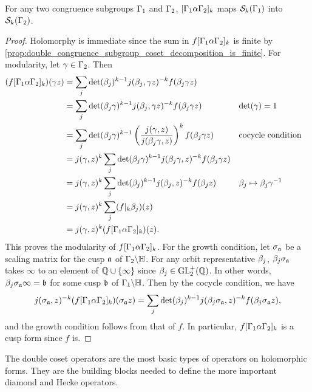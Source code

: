     \begin{proposition}\label{prop:double_coset_operator_preserves_subspaces_holomorphic}
      For any two congruence subgroups $\Gamma_{1}$ and $\Gamma_{2}$, $[\Gamma_{1}\alpha\Gamma_{2}]_{k}$ maps $\mathcal{S}_{k}(\Gamma_{1})$ into $\mathcal{S}_{k}(\Gamma_{2})$.
    \end{proposition}
    \begin{proof}
      Holomorphy is immediate since the sum in $f[\Gamma_{1}\alpha\Gamma_{2}]_{k}$ is finite by \cref{prop:double_congruence_subgroup_coset_decomposition_is_finite}. For modularity, let $\gamma \in \Gamma_{2}$. Then
      \begin{align*}
        (f[\Gamma_{1}\alpha\Gamma_{2}]_{k})(\gamma z) &= \sum_{j}\det(\beta_{j})^{k-1}j(\beta_{j},\gamma z)^{-k}f(\beta_{j}\gamma z) \\
        &= \sum_{j}\det(\beta_{j}\gamma)^{k-1}j(\beta_{j},\gamma z)^{-k}f(\beta_{j}\gamma z) && \text{$\det(\gamma) = 1$} \\
        &= \sum_{j}\det(\beta_{j}\gamma)^{k-1}\left(\frac{j(\gamma,z)}{j(\beta_{j}\gamma,z)}\right)^{k}f(\beta_{j}\gamma z) && \text{cocycle condition} \\
        &= j(\gamma,z)^{k}\sum_{j}\det(\beta_{j}\gamma)^{k-1}j(\beta_{j}\gamma,z)^{-k}f(\beta_{j}\gamma z) \\
        &= j(\gamma,z)^{k}\sum_{j}\det(\beta_{j})^{k-1}j(\beta_{j},z)^{-k}f(\beta_{j}z) && \text{$\beta_{j} \mapsto \beta_{j}\gamma^{-1}$} \\
        &= j(\gamma,z)^{k}\sum_{j}(f|_{k}\beta_{j})(z) \\
        &= j(\gamma,z)^{k}(f[\Gamma_{1}\alpha\Gamma_{2}]_{k})(z).
      \end{align*}
      This proves the modularity of $f[\Gamma_{1}\alpha\Gamma_{2}]_{k}$. For the growth condition, let $\sigma_{\mathfrak{a}}$ be a scaling matrix for the cusp $\mathfrak{a}$ of $\Gamma_{2}\backslash\mathbb{H}$. For any orbit representative $\beta_{j}$, $\beta_{j}\sigma_{\mathfrak{a}}$ takes $\infty$ to an element of $\mathbb{Q} \cup \{\infty\}$ since $\beta_{j} \in \mathrm{GL}_{2}^{+}(\mathbb{Q})$. In other words, $\beta_{j}\sigma_{\mathfrak{a}}\infty = \mathfrak{b}$ for some cusp $\mathfrak{b}$ of $\Gamma_{1}\backslash\mathbb{H}$. Then by the cocycle condition, we have
      \[
        j(\sigma_{\mathfrak{a}},z)^{-k}(f[\Gamma_{1}\alpha\Gamma_{2}]_{k})(\sigma_{\mathfrak{a}}z) = \sum_{j}\det(\beta_{j})^{k-1}j(\beta_{j}\sigma_{\mathfrak{a}},z)^{-k}f(\beta_{j}\sigma_{\mathfrak{a}}z),
      \]
      and the growth condition follows from that of $f$. In particular, $f[\Gamma_{1}\alpha\Gamma_{2}]_{k}$ is a cusp form since $f$ is.
    \end{proof}

    The double coset operators are the most basic types of operators on holomorphic forms. They are the building blocks needed to define the more important diamond and Hecke operators.
